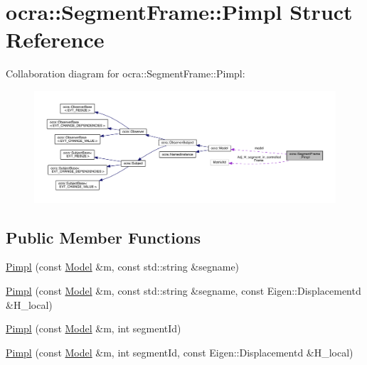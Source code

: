 \hypertarget{structocra_1_1SegmentFrame_1_1Pimpl}{}\section{ocra\+:\+:Segment\+Frame\+:\+:Pimpl Struct Reference}
\label{structocra_1_1SegmentFrame_1_1Pimpl}


Collaboration diagram for ocra\+:\+:Segment\+Frame\+:\+:Pimpl\+:
\nopagebreak
\begin{figure}[H]
\begin{center}
\leavevmode
\includegraphics[width=350pt]{dc/d06/structocra_1_1SegmentFrame_1_1Pimpl__coll__graph}
\end{center}
\end{figure}
\subsection*{Public Member Functions}
\begin{DoxyCompactItemize}
\item 
\hyperlink{structocra_1_1SegmentFrame_1_1Pimpl_a3e4a372b7ffde0baf617f8097a4d9285}{Pimpl} (const \hyperlink{classocra_1_1Model}{Model} \&m, const std\+::string \&segname)
\item 
\hyperlink{structocra_1_1SegmentFrame_1_1Pimpl_a419d287d9da1582ff94dd9c3ab539f2b}{Pimpl} (const \hyperlink{classocra_1_1Model}{Model} \&m, const std\+::string \&segname, const Eigen\+::\+Displacementd \&H\+\_\+local)
\item 
\hyperlink{structocra_1_1SegmentFrame_1_1Pimpl_a0de56572f8a4d14450c37bd71e432f2e}{Pimpl} (const \hyperlink{classocra_1_1Model}{Model} \&m, int segment\+Id)
\item 
\hyperlink{structocra_1_1SegmentFrame_1_1Pimpl_a6bc146a3436c88655f79afd8bf7a46b3}{Pimpl} (const \hyperlink{classocra_1_1Model}{Model} \&m, int segment\+Id, const Eigen\+::\+Displacementd \&H\+\_\+local)
\end{DoxyCompactItemize}
